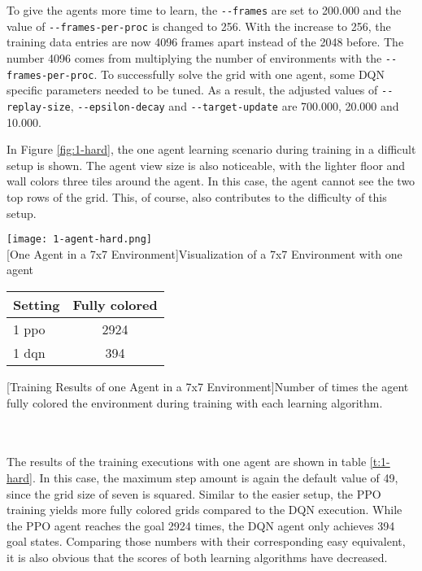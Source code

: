 To give the agents more time to learn, the \verb|--frames| are set to 200.000 and the value of \verb|--frames-per-proc| is changed to 256. With the increase to 256, the training data entries are now 4096 frames apart instead of the 2048 before. The number 4096 comes from multiplying the number of environments with the \verb|--frames-per-proc|. To successfully solve the grid with one agent, some DQN specific parameters needed to be tuned. As a result, the adjusted values of \verb|--replay-size|, \verb|--epsilon-decay| and \verb|--target-update| are 700.000, 20.000 and 10.000. 

In Figure \ref{fig:1-hard}, the one agent learning scenario during training in a difficult setup is shown. The agent view size is also noticeable, with the lighter floor and wall colors three tiles around the agent. In this case, the agent cannot see the two top rows of the grid. This, of course, also contributes to the difficulty of this setup. \\

\begin{minipage}{\textwidth}
  \begin{minipage}[b]{0.29\textwidth}
    \centering
    \texttt{[image: 1-agent-hard.png]}\\
    [One Agent in a 7x7 Environment]{Visualization of a 7x7 Environment with one agent}\label{fig:1-hard}
  \end{minipage}
  \hfill
  \begin{minipage}[b]{0.69\textwidth}
    \centering
    \begin{tabular}{lc}\hline
      Setting & Fully colored \\ \hline
        1 ppo & 2924 \\
        1 dqn & 394 \\ \hline
      \end{tabular}
      [Training Results of one Agent in a 7x7 Environment]{Number of times the agent fully colored the environment during training with each learning algorithm.\\ }\label{t:1-hard}
    \end{minipage}
  \end{minipage}\\\\

The results of the training executions with one agent are shown in table \ref{t:1-hard}. In this case, the maximum step amount is again the default value of 49, since the grid size of seven is squared. Similar to the easier setup, the PPO training yields more fully colored grids compared to the DQN execution. While the PPO agent reaches the goal 2924 times, the DQN agent only achieves 394 goal states. Comparing those numbers with their corresponding easy equivalent, it is also obvious that the scores of both learning algorithms have decreased.

